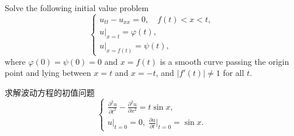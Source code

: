 \begin{exercise}
  Solve the following initial value problem
  \[\begin{cases}
    u_{tt} - u_{xx} = 0,\quad f(t) < x < t, \\
    u|_{x=t} = \varphi(t), \\
    u|_{x = f(t)} = \psi(t),
  \end{cases}\]
  where $\varphi(0)=\psi(0)=0$ and $x = f(t)$ is a smooth curve
  passing the origin point and lying between $x=t$ and $x=-t$,
  and $|f'(t)|\neq 1$ for all $t$.
\end{exercise}



\begin{exercise}[8]
  求解波动方程的初值问题
  \[
    \begin{cases}
      \frac{\partial^2u}{\partial t^2} - \frac{\partial^2u}{\partial x^2} = t\sin x, \\
      u|_{t=0} = 0,\; \frac{\partial u}{\partial t}\Big|_{t=0} = \sin x.
    \end{cases}
  \]
\end{exercise}

